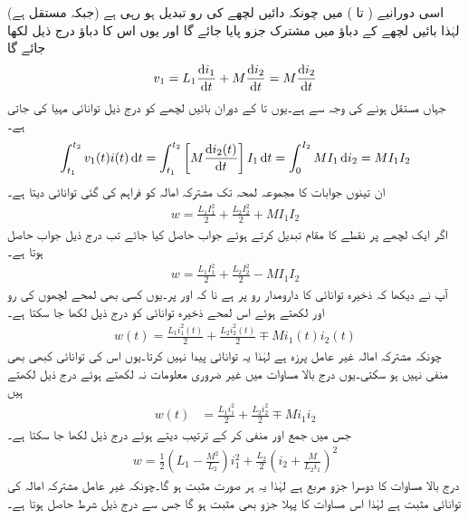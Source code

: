اسی دورانیے ( تا )  میں چونکہ دائیں لچھے کی رو تبدیل ہو رہی ہے (جبکہ  مستقل ہے) لہٰذا بائیں لچھے کے دباؤ میں مشترک جزو پایا جائے گا اور یوں اس کا دباؤ درج ذیل لکھا جائے گا
\begin{align*}
v_1=L_1 \frac{\dif i_1}{\dif t}+M \frac{\dif i_2}{\dif t}=M\frac{\dif i_2}{\dif t}
\end{align*}
جہاں  مستقل ہونے کی وجہ سے  ہے۔یوں  تا  کے دوران بائیں لچھے کو درج ذیل توانائی مہیا کی جاتی ہے۔
\begin{align*}
\int_{t_1}^{t_2} v_1(t) i(t)\dif t=\int_{t_1}^{t_2} \left[M \frac{\dif i_2(t)}{\dif t}\right] I_1 \dif t=\int_{0}^{I_2} M I_1 \dif i_2=M I_1 I_2
\end{align*}
ان تینوں جوابات کا مجموعہ لمحہ  تک مشترکہ امالہ کو فراہم کی گئی توانائی دیتا ہے۔
\begin{align}\label{مساوات_مقناطیسی_توانائی_مشترکہ_امالہ_الف}
w=\frac{L_1 I_1^2}{2}+\frac{L_2 I_2^2}{2}+MI_1 I_2
\end{align}
اگر ایک لچھے پر نقطے کا مقام تبدیل کرتے ہوئے جواب حاصل کیا جائے تب درج ذیل جواب حاصل ہوتا ہے۔
\begin{align}\label{مساوات_مقناطیسی_توانائی_مشترکہ_امالہ_ب}
w=\frac{L_1 I_1^2}{2}+\frac{L_2 I_2^2}{2}-MI_1 I_2
\end{align}
آپ نے دیکھا کہ ذخیرہ توانائی کا دارومدار رو پر ہے نا کہ  اور  پر۔یوں کسی بھی لمحے لچھوں کی رو  اور  لکھتے ہوئے اس لمحے ذخیرہ توانائی کو درج ذیل لکھا جا سکتا ہے۔
\begin{align}\label{مساوات_مقناطیسی_توانائی_مشترکہ_امالہ_پ}
w(t)=\frac{L_1 i^2_1(t)}{2}+\frac{L_2 i^2_2(t)}{2}\mp M i_1(t) i_2(t)
\end{align}
چونکہ مشترکہ امالہ غیر عامل پرزہ ہے لہٰذا یہ توانائی پیدا نہیں کرتا۔یوں اس کی توانائی کبھی بھی منفی نہیں ہو سکتی۔یوں درج بالا مساوات میں غیر ضروری معلومات نہ لکھتے ہوئے درج ذیل لکھتے ہیں
\begin{align}
w(t)&=\frac{L_1 i^2_1}{2}+\frac{L_2 i^2_2}{2}\mp M i_1 i_2
\end{align}
جس میں  جمع اور منفی کر کے ترتیب دیتے ہوئے درج ذیل لکھا جا سکتا ہے۔
\begin{align}
w=\frac{1}{2} \left(L_1-\frac{M^2}{L_2}\right)i^2_1+\frac{L_2}{2}\left(i_2+\frac{M}{L_2 i_1}\right)^2
\end{align}
درج بالا مساوات کا دوسرا جزو مربع ہے لہٰذا یہ ہر صورت مثبت ہو گا۔چونکہ غیر عامل مشترکہ امالہ کی توانائی مثبت ہے لہٰذا اس مساوات کا پہلا جزو بھی مثبت ہو گا جس سے درج ذیل شرط حاصل ہوتا ہے۔
